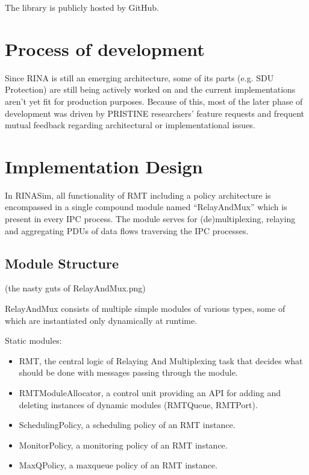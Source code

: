         The library is publicly hosted by GitHub.

    \section{Process of development}
        Since RINA is still an emerging architecture, some of its parts (e.g. SDU Protection) are still being actively worked on and the current implementations aren't yet fit for production purposes. Because of this, most of the later phase of development was driven by PRISTINE researchers' feature requests and frequent mutual feedback regarding architectural or implementational issues.

    \section{Implementation Design}

        In RINASim, all functionality of RMT including a policy architecture is encompassed in a single compound module named ``RelayAndMux'' which is present in every IPC process. The module serves for (de)multiplexing, relaying and aggregating PDUs of data flows traversing the IPC processes.

        \subsection{Module Structure}

            (the nasty guts of RelayAndMux.png)

            RelayAndMux consists of multiple simple modules of various types, some of which are instantiated only dynamically at runtime.

            Static modules:
            \begin{itemize}
                \item RMT, the central logic of Relaying And Multiplexing task that decides what should be done with messages passing through the module.
                \item RMTModuleAllocator, a control unit providing an API for adding and deleting instances of dynamic modules (RMTQueue, RMTPort).
                \item SchedulingPolicy, a scheduling policy of an RMT instance.
                \item MonitorPolicy, a monitoring policy of an RMT instance.
                \item MaxQPolicy, a maxqueue policy of an RMT instance.
            \end{itemize}

